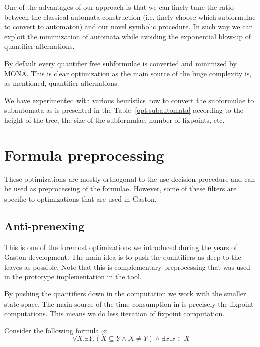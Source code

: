   One of the advantages of our approach is that we can finely tune
  the ratio between the classical automata construction (i.e. finely
  choose which subformulae to convert to automaton) and our novel
  symbolic procedure. In such way we can exploit the minimization
  of automata while avoiding the exponential blow-up of quantifier
  alternations.
  
  By default every quantifier free subformulae is converted and
  minimized by MONA. This is clear optimization as the main source
  of the huge complexity is, as mentioned, quantifier alternations.
  
  We have experimented with various heuristics how to convert the
  subformulae to subautomata as is presented in the
  Table~\ref{opt:subautomata} according to the height of the tree, 
  the size of the subformulae, number of fixpoints, etc.

\section{Formula preprocessing}
These optimizations are mostly orthogonal to the use decision 
procedure and can be used as preprocessing of the formulae.
However, some of these filters are specific to optimizations that
are used in Gaston.

  \subsection{Anti-prenexing}
  
  This is one of the foremost optimizations we introduced during the
  years of Gaston development. The main idea is to push the
  quantifiers as deep to the leaves as possible. Note that this is
  complementary preprocessing that was used in the prototype 
  implementation in the \dwina tool. 
  
   By pushing the quantifiers down in the computation
  we work with the smaller state space. The main source of the time consumption
  in \gaston is precisely the fixpoint computations. This means we do less 
  iteration of fixpoint computation.
  
   Consider the following formula $\varphi$:
  \begin{equation}
  \forall X. \exists Y. (X \subseteq Y \wedge X \neq Y) \wedge \exists x. x \in X \label{eq:ap-example}
  \end{equation}

